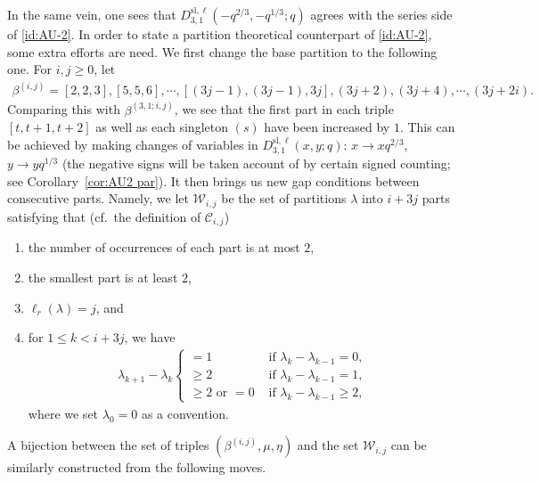 \documentclass[11pt,reqno]{amsart}
\numberwithin{equation}{section}
\theoremstyle{plain}
\theoremstyle{definition}
\def\sl{\mathrm{sl}}
\def\la{\lambda}
\def\C{\mathcal{C}}
\newcommand{\W}{\mathcal{W}}
\begin{document}
In the same vein, one sees that $D_{3,1}^{\sl,\ell}(-q^{2/3},-q^{1/3};q)$ agrees with the series side of \eqref{id:AU-2}. In order to state a partition theoretical counterpart of \eqref{id:AU-2}, some extra efforts are need. We first change the base partition to the following one. For $i,j\ge 0$, let
\begin{align*}
\beta^{(i, j)}=[2, 2, 3], [5, 5, 6], \cdots, [(3j-1), (3j-1), 3j], (3j+2), (3j+4), \cdots, (3j+2i).
\end{align*}
Comparing this with $\beta^{(3,1;i,j)}$, we see that the first part in each triple $[t,t+1,t+2]$ as well as each singleton $(s)$ have been increased by $1$. This can be achieved by making changes of variables in $D_{3,1}^{\sl,\ell}(x,y;q)$: $x\to xq^{2/3}$, $y\to yq^{1/3}$ (the negative signs will be taken account of by certain signed counting; see Corollary~\ref{cor:AU2 par}). It then brings us new gap conditions between consecutive parts. Namely, we let $\W_{i, j}$ be the set of partitions $\la$ into $i+3j$ parts satisfying that (cf.~the definition of $\C_{i,j}$)
\begin{enumerate}[(1)]
    \item the number of occurrences of each part is at most $2$,
    \item the smallest part is at least $2$,
    \item $\ell_r(\la)=j$, and
    \item for $1\leq k< i+3j$, we have 
      \begin{align*}
      \la_{k+1}-\la_{k}
      \begin{cases}
      = 1 & \text{ if $\la_{k}-\la_{k-1}=0$,}\\
      \geq 2 & \text{ if $\la_k-\la_{k-1}=1$,}\\
      \text{$\ge 2$ or $=0$} & \text{ if $\la_k-\la_{k-1}\ge 2$,}
      \end{cases}
      \end{align*} 
      where we set $\la_0=0$ as a convention.
\end{enumerate}

A bijection between the set of triples $(\beta^{(i, j)}, \mu, \eta)$ and the set $\W_{i, j}$ can be similarly constructed from the following moves.
\end{document}
